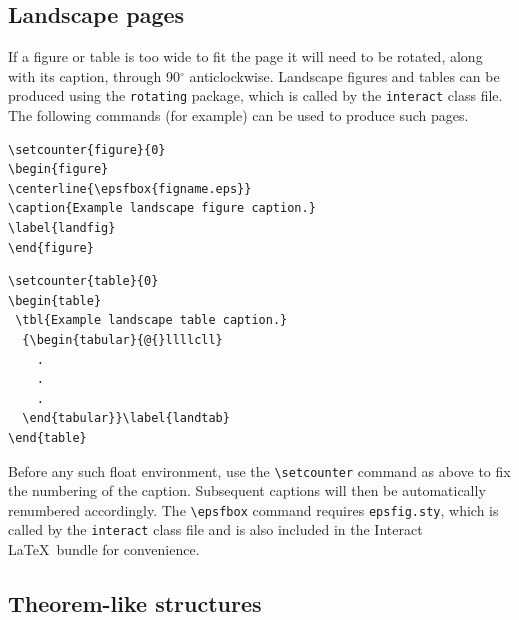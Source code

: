 \documentclass[]{interact}
\theoremstyle{plain}%
\theoremstyle{definition}
\theoremstyle{remark}
\begin{document}
\subsection{Landscape pages}

If a figure or table is too wide to fit the page it will need to be rotated, along with its caption, through 90$^{\circ}$ anticlockwise.
Landscape figures and tables can be produced using the \verb"rotating" package, which is called by the \texttt{interact} class file.
The following commands (for example) can be used to produce such pages.
\begin{verbatim}
\setcounter{figure}{0}
\begin{figure}
\centerline{\epsfbox{figname.eps}}
\caption{Example landscape figure caption.}
\label{landfig}
\end{figure}
\end{verbatim}
\begin{verbatim}
\setcounter{table}{0}
\begin{table}
 \tbl{Example landscape table caption.}
  {\begin{tabular}{@{}llllcll}
    .
    .
    .
  \end{tabular}}\label{landtab}
\end{table}
\end{verbatim}
Before any such float environment, use the \verb"\setcounter" command as above to fix the numbering of the caption. Subsequent captions will then be automatically renumbered accordingly.
The \verb"\epsfbox" command requires \verb"epsfig.sty", which is called by the \texttt{interact} class file and is also included in the \textsf{Interact} \LaTeX\ bundle for convenience.


\subsection{Theorem-like structures}
\end{document}
